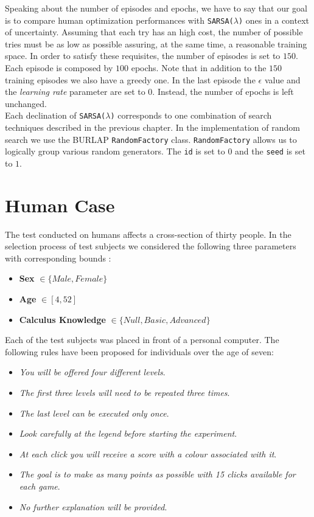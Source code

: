Speaking about the number of episodes and epochs, we have to say that our goal is to compare human optimization performances with {\tt SARSA($\lambda$)} ones in a context of uncertainty. Assuming that each try has an high cost, the number of possible tries must be as low as possible assuring, at the same time, a reasonable training space. In order to satisfy these requisites, the number of episodes is set to $150$. Each episode is composed by $100$ epochs. Note that in addition to the $150$ training episodes we also have a greedy one. In the last episode the $\epsilon$ value and the \textit{learning rate} parameter are set to $0$. Instead, the number of epochs is left unchanged.  \\

Each declination of {\tt SARSA(\textit{$\lambda$})} corresponds to one combination of search techniques described in the previous chapter. In the implementation of random search we use the BURLAP {\tt RandomFactory} class. {\tt RandomFactory} allows us to logically group various random generators. The {\tt id} is set to $0$ and the {\tt seed} is set to $1$.

\section{Human Case}

The test conducted on humans affects a cross-section of thirty people. In the selection process of test subjects we considered the following three parameters with corresponding bounds :

\begin{itemize}
	\item \textbf{Sex} $\in \{Male, Female\}$
	\item \textbf{Age} $\in [4, 52]$
	\item \textbf{Calculus Knowledge} $\in \{Null, Basic, Advanced\}$ 
\end{itemize}  

Each of the test subjects was placed in front of a personal computer. The following rules have been proposed for individuals over the age of seven:

	
\begin{itemize}
	\item \textit{You will be offered four different levels}.
	\item \textit{The first three levels will need to be repeated three times}.
	\item \textit{The last level can be executed only once}.
	\item \textit{Look carefully at the legend before starting the experiment}.
	\item \textit{At each click you will receive a score with a colour associated with it}.
	\item \textit{The goal is to make as many points as possible with 15 clicks available for each game}.
	\item \textit{No further explanation will be provided}.
\end{itemize}


